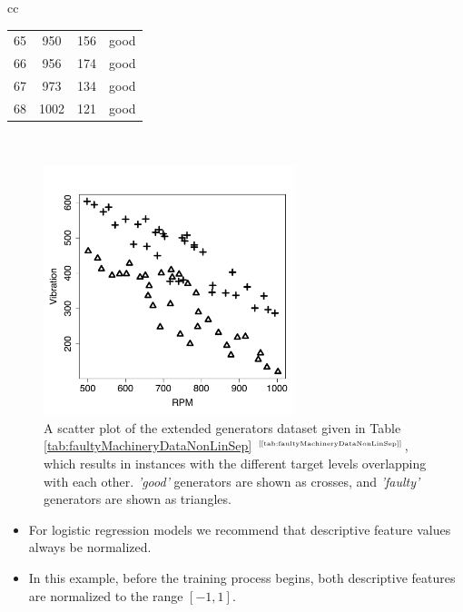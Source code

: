 \documentclass[xcolor={table}]{beamer}
\newcommand{\featL}[1]{\textit{'#1'}}
\newcommand{\ourRef}[1]{\ref{#1} $^{\text{\tiny[\pageref{#1}]}}$}
\begin{document}
\begin{frame}[plain]
\begin{table}[!thb]
\begin{tiny}
{\begin{tabular}{cc}
\begin{minipage}{0.48\textwidth}
\begin{tabular}[ht]{ c c c c }
65	&	950	&	156	&	good	\\
66	&	956	&	174	&	good	\\
67	&	973	&	134	&	good	\\
68	&	1002	&	121	&	good	\\
\hline
				\end{tabular}
			\end{minipage}\\
\end{tabular}
}
\end{tiny}
\end{table}
\end{frame} 



 \begin{frame} [plain]
\begin{figure}[htb]
\begin{center}
\includegraphics[width=0.65\textwidth]{./images/gradientDescentLogisticClassificationDemoBadSepDataset.pdf}
	\caption{A scatter plot of the extended generators dataset given in Table \ourRef{tab:faultyMachineryDataNonLinSep}, which results in instances with the different target levels overlapping with each other. \featL{good} generators are shown as crosses, and \featL{faulty} generators are shown as triangles.}
	\label{fig:faultyMachinesDataNonLinearSep}
\end{center}
\end{figure}
\end{frame} 

\begin{frame}
\begin{itemize}
	\item For logistic regression models we recommend that descriptive feature values always be normalized. 
	\item In this example, before the training process begins, both descriptive features are normalized to the range $\left[-1, 1\right]$.
\end{itemize}
\end{frame}
\end{document}
